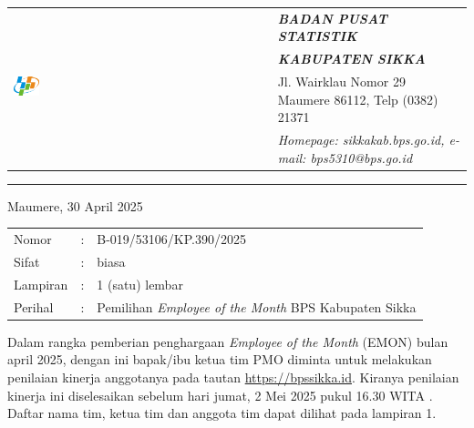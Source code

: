 \documentclass{article}
\begin{document}




\begin{tabular}{ll}
   \multirow{4}{*}{\includegraphics[width=0.10\textwidth]{logo/bps-logo.png}} %
   &
   \large{\textbf{\textit{BADAN PUSAT STATISTIK}}} \\
   & \large{\textbf{\textit{KABUPATEN SIKKA}}} \\
   & Jl. Wairklau Nomor 29 Maumere 86112, Telp (0382) 21371 \\
   & \textit{Homepage: sikkakab.bps.go.id, e-mail: bps5310@bps.go.id} \\
\end{tabular}

\hfill

\vspace{-1em} %

\rule{\linewidth}{1pt} %


\hfill
Maumere, 30 April 2025

\begin{tabular}{@{} lcl}
	Nomor&:&B-019/53106/KP.390/2025 \\
	Sifat&:&biasa \\
	Lampiran&:&1 (satu) lembar\\
    Perihal&:& Pemilihan \textit{Employee of the Month} BPS Kabupaten Sikka\\
\end{tabular}

\bigskip %

Dalam rangka pemberian penghargaan \textit{Employee of the Month} (EMON) bulan april 2025, dengan ini bapak/ibu ketua tim PMO diminta untuk melakukan penilaian kinerja anggotanya pada tautan \href{https://bpssikka.id/}{https://bpssikka.id}.
Kiranya penilaian kinerja ini diselesaikan sebelum hari jumat, 2 Mei 2025 pukul 16.30 WITA \@.
Daftar nama tim, ketua tim dan anggota tim dapat dilihat pada lampiran 1.
\end{document}
